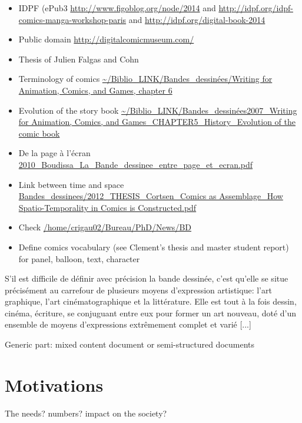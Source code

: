 \begin{itemize}
	\item IDPF (ePub3 \url{http://www.figoblog.org/node/2014} and \url{http://idpf.org/idpf-comics-manga-workshop-paris} and \url{http://idpf.org/digital-book-2014}
	\item Public domain \url{http://digitalcomicmuseum.com/}
	\item Thesis of Julien Falgas and Cohn
	\item Terminology of comics \url{~/Biblio_LINK/Bandes_dessinées/Writing for Animation, Comics, and Games, chapter 6}
	\item Evolution of the story book \url{~/Biblio_LINK/Bandes_dessinées2007_Writing for Animation, Comics, and Games_CHAPTER5_History_Evolution of the comic book}
	\item De la page à l'écran \url{2010_Boudissa_La_Bande_dessinee_entre_page_et_ecran.pdf}
	\item Link between time and space \url{Bandes_dessinees/2012_THESIS_Cortsen_Comics as Assemblage_How Spatio-Temporality in Comics is Constructed.pdf}
	\item Check \url{/home/crigau02/Bureau/PhD/News/BD}
	\item Define comics vocabulary (see Clement's thesis and master student report) for panel, balloon, text, character
	
\end{itemize}

S'il est difficile de définir avec précision la bande dessinée, c'est qu'elle se situe précisément au carrefour de plusieurs moyens d'expression artistique: l'art graphique, l'art cinématographique et la littérature. Elle est tout à la fois dessin, cinéma, écriture, se conjuguant entre eux pour former un art nouveau, doté d'un ensemble de moyens d'expressions extrêmement complet et varié [...]~\cite{duc1997art}

Generic part: mixed content document or semi-structured documents

\section{Motivations}
The needs? numbers? impact on the society?

